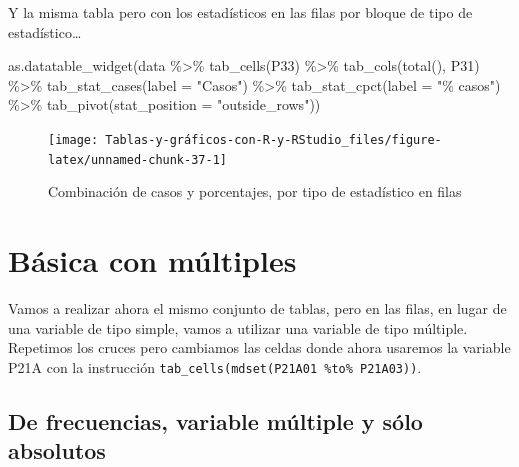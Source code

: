 \documentclass[
]{book}
\newenvironment{Shaded}{\begin{snugshade}}{\end{snugshade}}
\newcommand{\AttributeTok}[1]{\textcolor[rgb]{0.77,0.63,0.00}{#1}}
\newcommand{\FunctionTok}[1]{\textcolor[rgb]{0.00,0.00,0.00}{#1}}
\newcommand{\NormalTok}[1]{#1}
\newcommand{\SpecialCharTok}[1]{\textcolor[rgb]{0.00,0.00,0.00}{#1}}
\newcommand{\StringTok}[1]{\textcolor[rgb]{0.31,0.60,0.02}{#1}}
\begin{document}
Y la misma tabla pero con los estadísticos en las filas por bloque de tipo de estadístico\ldots{}

\begin{Shaded}
\begin{Highlighting}[]
\FunctionTok{as.datatable\_widget}\NormalTok{(data }\SpecialCharTok{\%\textgreater{}\%} \FunctionTok{tab\_cells}\NormalTok{(P33) }\SpecialCharTok{\%\textgreater{}\%} \FunctionTok{tab\_cols}\NormalTok{(}\FunctionTok{total}\NormalTok{(), }
\NormalTok{  P31) }\SpecialCharTok{\%\textgreater{}\%} \FunctionTok{tab\_stat\_cases}\NormalTok{(}\AttributeTok{label =} \StringTok{"Casos"}\NormalTok{) }\SpecialCharTok{\%\textgreater{}\%} \FunctionTok{tab\_stat\_cpct}\NormalTok{(}\AttributeTok{label =} \StringTok{"\% casos"}\NormalTok{) }\SpecialCharTok{\%\textgreater{}\%} 
  \FunctionTok{tab\_pivot}\NormalTok{(}\AttributeTok{stat\_position =} \StringTok{"outside\_rows"}\NormalTok{))}
\end{Highlighting}
\end{Shaded}

\begin{figure}[H]

{\centering \texttt{[image: Tablas-y-gráficos-con-R-y-RStudio\_files/figure-latex/unnamed-chunk-37-1]} 

}

\caption{Combinación de casos y porcentajes, por tipo de estadístico en filas}\label{fig:unnamed-chunk-37}
\end{figure}

\hypertarget{buxe1sica-con-muxfaltiples}{%
\section{Básica con múltiples}\label{buxe1sica-con-muxfaltiples}}

Vamos a realizar ahora el mismo conjunto de tablas, pero en las filas, en lugar de una variable de tipo simple, vamos a utilizar una variable de tipo múltiple. Repetimos los cruces pero cambiamos las celdas donde ahora usaremos la variable P21A con la instrucción \texttt{tab\_cells(mdset(P21A01\ \%to\%\ P21A03))}.

\hypertarget{de-frecuencias-variable-muxfaltiple-y-suxf3lo-absolutos}{%
\subsection{De frecuencias, variable múltiple y sólo absolutos}\label{de-frecuencias-variable-muxfaltiple-y-suxf3lo-absolutos}}
\end{document}
